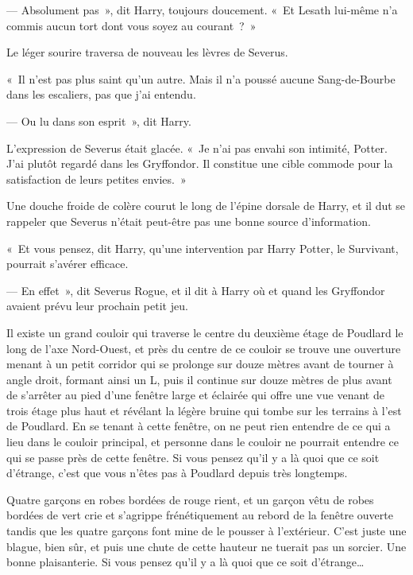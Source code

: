 --- Absolument pas~», dit Harry, toujours doucement. «~Et Lesath lui-même n'a commis aucun tort dont vous soyez au courant~?~»

Le léger sourire traversa de nouveau les lèvres de Severus.

«~Il n'est pas plus saint qu'un autre. Mais il n'a poussé aucune Sang-de-Bourbe dans les escaliers, pas que j'ai entendu.

--- Ou lu dans son esprit~», dit Harry.

L'expression de Severus était glacée. «~Je n'ai pas envahi son intimité, Potter. J'ai plutôt regardé dans les Gryffondor. Il constitue une cible commode pour la satisfaction de leurs petites envies.~»

Une douche froide de colère courut le long de l'épine dorsale de Harry, et il dut se rappeler que Severus n'était peut-être pas une bonne source d'information.

«~Et vous pensez, dit Harry, qu'une intervention par Harry Potter, le Survivant, pourrait s'avérer efficace.

--- En effet~», dit Severus Rogue, et il dit à Harry où et quand les Gryffondor avaient prévu leur prochain petit jeu.

\later

Il existe un grand couloir qui traverse le centre du deuxième étage de Poudlard le long de l'axe Nord-Ouest, et près du centre de ce couloir se trouve une ouverture menant à un petit corridor qui se prolonge sur douze mètres avant de tourner à angle droit, formant ainsi un L, puis il continue sur douze mètres de plus avant de s'arrêter au pied d'une fenêtre large et éclairée qui offre une vue venant de trois étage plus haut et révélant la légère bruine qui tombe sur les terrains à l'est de Poudlard. En se tenant à cette fenêtre, on ne peut rien entendre de ce qui a lieu dans le couloir principal, et personne dans le couloir ne pourrait entendre ce qui se passe près de cette fenêtre. Si vous pensez qu'il y a là quoi que ce soit d'étrange, c'est que vous n'êtes pas à Poudlard depuis très longtemps.

Quatre garçons en robes bordées de rouge rient, et un garçon vêtu de robes bordées de vert crie et s'agrippe frénétiquement au rebord de la fenêtre ouverte tandis que les quatre garçons font mine de le pousser à l'extérieur. C'est juste une blague, bien sûr, et puis une chute de cette hauteur ne tuerait pas un sorcier. Une bonne plaisanterie. Si vous pensez qu'il y a là quoi que ce soit d'étrange…

